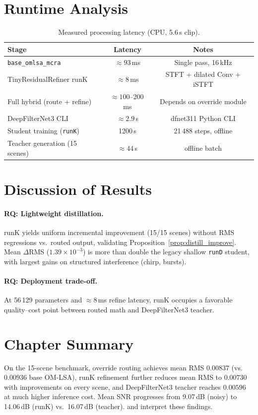 \section{Runtime Analysis}
\label{sec:runtime}

\begin{table}[H]
  \centering
  \caption{Measured processing latency (CPU, 5.6\,s clip).}
  \label{tab:runtime}
  \begin{tabular}{lcc}
    \toprule
    \textbf{Stage} & \textbf{Latency} & \textbf{Notes} \\
    \midrule
    \texttt{base\_omlsa\_mcra}     & $\approx 93$\,ms   & Single pass, 16\,kHz \\
    TinyResidualRefiner runK     & $\approx 8$\,ms    & STFT + dilated Conv + iSTFT \\
    Full hybrid (route + refine) & $\approx 100$--200\,ms & Depends on override module \\
    DeepFilterNet3 CLI           & $\approx 2.9$\,s   & dfnet311 Python CLI \\
    Student training (\texttt{runK}) & 1200\,s & 21\,488 steps, offline \\
    Teacher generation (15 scenes) & $\approx 44$\,s & offline batch \\
    \bottomrule
  \end{tabular}
\end{table}

\section{Discussion of Results}
\label{sec:exp_discussion}

\paragraph{RQ: Lightweight distillation.}
runK yields uniform incremental improvement (15/15 scenes) without RMS regressions vs.\ routed output, validating Proposition~\ref{prop:distill_improve}. Mean $\Delta$RMS ($1.39\times10^{-3}$) is more than double the legacy shallow \texttt{runD} student, with largest gains on structured interference (chirp, bursts).

\paragraph{RQ: Deployment trade-off.}
At 56\,129 parameters and $\approx 8$\,ms refine latency, runK occupies a favorable quality--cost point between routed math and DeepFilterNet3 teacher.

\section{Chapter Summary}
\label{sec:exp_summary}

On the 15-scene benchmark, override routing achieves mean RMS $0.00837$ (vs.\ $0.00936$ base OM-LSA), runK refinement further reduces mean RMS to $0.00730$ with improvements on every scene, and DeepFilterNet3 teacher reaches $0.00596$ at much higher inference cost. Mean SNR progresses from 9.07\,dB (noisy) to 14.06\,dB (runK) vs.\ 16.07\,dB (teacher).  and  interpret these findings.
